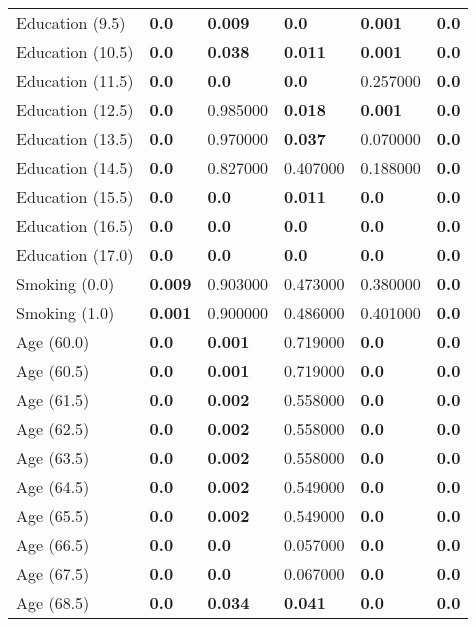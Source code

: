 \begin{tabular}{llllll}
Education (9.5) & \textbf{0.0} & \textbf{0.009} & \textbf{0.0} & \textbf{0.001} & \textbf{0.0} \\
Education (10.5) & \textbf{0.0} & \textbf{0.038} & \textbf{0.011} & \textbf{0.001} & \textbf{0.0} \\
Education (11.5) & \textbf{0.0} & \textbf{0.0} & \textbf{0.0} & 0.257000 & \textbf{0.0} \\
Education (12.5) & \textbf{0.0} & 0.985000 & \textbf{0.018} & \textbf{0.001} & \textbf{0.0} \\
Education (13.5) & \textbf{0.0} & 0.970000 & \textbf{0.037} & 0.070000 & \textbf{0.0} \\
Education (14.5) & \textbf{0.0} & 0.827000 & 0.407000 & 0.188000 & \textbf{0.0} \\
Education (15.5) & \textbf{0.0} & \textbf{0.0} & \textbf{0.011} & \textbf{0.0} & \textbf{0.0} \\
Education (16.5) & \textbf{0.0} & \textbf{0.0} & \textbf{0.0} & \textbf{0.0} & \textbf{0.0} \\
Education (17.0) & \textbf{0.0} & \textbf{0.0} & \textbf{0.0} & \textbf{0.0} & \textbf{0.0} \\
Smoking (0.0) & \textbf{0.009} & 0.903000 & 0.473000 & 0.380000 & \textbf{0.0} \\
Smoking (1.0) & \textbf{0.001} & 0.900000 & 0.486000 & 0.401000 & \textbf{0.0} \\
Age (60.0) & \textbf{0.0} & \textbf{0.001} & 0.719000 & \textbf{0.0} & \textbf{0.0} \\
Age (60.5) & \textbf{0.0} & \textbf{0.001} & 0.719000 & \textbf{0.0} & \textbf{0.0} \\
Age (61.5) & \textbf{0.0} & \textbf{0.002} & 0.558000 & \textbf{0.0} & \textbf{0.0} \\
Age (62.5) & \textbf{0.0} & \textbf{0.002} & 0.558000 & \textbf{0.0} & \textbf{0.0} \\
Age (63.5) & \textbf{0.0} & \textbf{0.002} & 0.558000 & \textbf{0.0} & \textbf{0.0} \\
Age (64.5) & \textbf{0.0} & \textbf{0.002} & 0.549000 & \textbf{0.0} & \textbf{0.0} \\
Age (65.5) & \textbf{0.0} & \textbf{0.002} & 0.549000 & \textbf{0.0} & \textbf{0.0} \\
Age (66.5) & \textbf{0.0} & \textbf{0.0} & 0.057000 & \textbf{0.0} & \textbf{0.0} \\
Age (67.5) & \textbf{0.0} & \textbf{0.0} & 0.067000 & \textbf{0.0} & \textbf{0.0} \\
Age (68.5) & \textbf{0.0} & \textbf{0.034} & \textbf{0.041} & \textbf{0.0} & \textbf{0.0} \\

\end{tabular}
